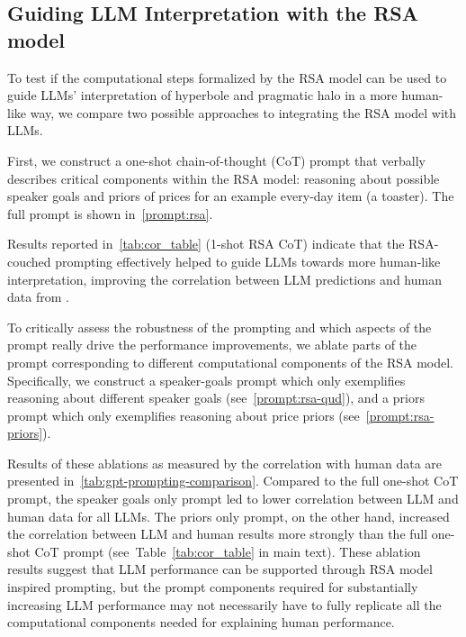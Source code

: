 \subsection{Guiding LLM Interpretation with the RSA model}
\label{sec:prompting}

To test if the computational steps formalized by the RSA model
can be used to guide LLMs’ interpretation of hyperbole and pragmatic halo in a more human-like way, we compare two possible approaches to integrating the RSA model with LLMs. 

First, we construct a one-shot chain-of-thought (CoT) prompt that verbally describes critical components within the RSA model: reasoning about possible speaker goals and priors of prices for an example every-day item (a toaster).
The full prompt is shown in~\autoref{prompt:rsa}.


Results reported in~\autoref{tab:cor_table} (1-shot RSA CoT) indicate that the RSA-couched prompting effectively helped to guide LLMs towards more human-like interpretation, improving the correlation between LLM predictions and human data from \citet{kao2014nonliteral}.

To critically assess the robustness of the prompting and which aspects of the prompt really drive the performance improvements, we ablate parts of the prompt corresponding to different computational components of the RSA model.
Specifically, we construct a speaker-goals prompt which only exemplifies reasoning about different speaker goals (see~\autoref{prompt:rsa-qud}), and a priors prompt which only exemplifies reasoning about price priors (see~\autoref{prompt:rsa-priors}).


Results of these ablations as measured by the correlation with human data are presented in~\autoref{tab:gpt-prompting-comparison}.
Compared to the full one-shot CoT prompt, the speaker goals only prompt led to lower correlation between LLM and human data for all LLMs.
The priors only prompt, on the other hand, increased the correlation between LLM and human results more strongly than the full one-shot CoT prompt (see~Table~\ref{tab:cor_table} in main text). 
These ablation results suggest
that LLM performance can be supported through RSA model
inspired prompting, but the prompt components required for substantially increasing LLM performance may not necessarily have to fully replicate all the computational components
needed for explaining human performance.

